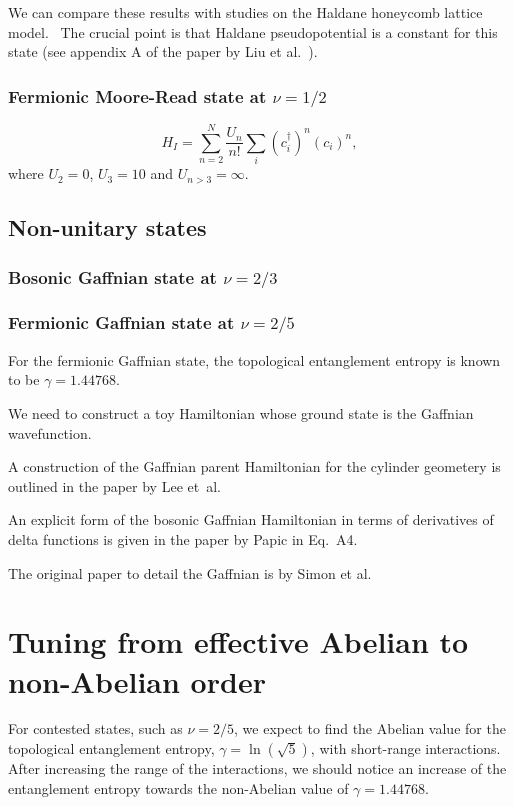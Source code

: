 \documentclass[floatfix,showpacs,amsmath,amsfonts,amssymb,aps,twocolumn, prb,groupedaddress]{revtex4-1}
\begin{document}
We can compare these results with studies on the Haldane honeycomb lattice model.~\cite{Zhu15, Wang12}  The crucial point is that Haldane pseudopotential is a constant for this state (see appendix A of the paper by Liu et al.~\cite{Liu12}).

\subsubsection{Fermionic Moore-Read state at $\nu=1/2$}

\begin{equation}
H_I = \sum_{n=2}^N \frac{U_n}{n!} \sum_{i} (c^\dagger_i)^n (c_i)^n,
\end{equation}
where $U_2=0$, $U_3=10$ and $U_{n>3}=\infty$.

\subsection{Non-unitary states}

\subsubsection{Bosonic Gaffnian state at $\nu=2/3$}

\subsubsection{Fermionic Gaffnian state at $\nu=2/5$}

For the fermionic Gaffnian state, the topological entanglement entropy is known to be $\gamma=1.44768$.~\cite{Estienne15}

We need to construct a toy Hamiltonian whose ground state is the Gaffnian wavefunction.

A construction of the Gaffnian parent Hamiltonian for the cylinder geometery is outlined in the paper by Lee et~al.~\cite{Lee15}

An explicit form of the bosonic Gaffnian Hamiltonian in terms of derivatives of delta functions is given in the paper by Papic in Eq.~A4.~\cite{Papic14}

The original paper to detail the Gaffnian is by Simon et al.~\cite{Simon07}



\section{Tuning from effective Abelian to non-Abelian order}

For contested states, such as $\nu=2/5$, we expect to find the Abelian value for the topological entanglement entropy, $\gamma=\ln(\sqrt{5})$, with short-range interactions. After increasing the range of the interactions, we should notice an increase of the entanglement entropy towards the non-Abelian value of $\gamma=1.44768$.



\end{document}
